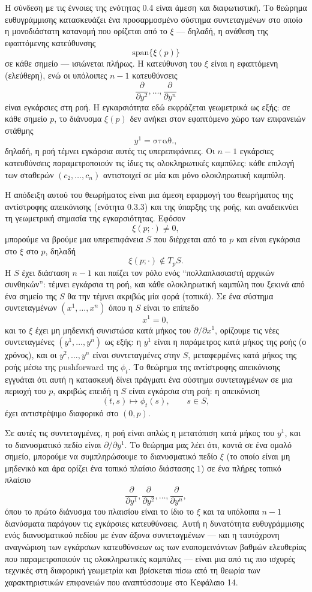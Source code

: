 \documentclass[12pt]{article}
\begin{document}
Η σύνδεση με τις έννοιες της ενότητας 0.4 είναι άμεση και διαφωτιστική. Το θεώρημα ευθυγράμμισης κατασκευάζει ένα προσαρμοσμένο σύστημα συντεταγμένων στο οποίο η μονοδιάστατη κατανομή που ορίζεται από το $\xi$ --- δηλαδή, η ανάθεση της εφαπτόμενης κατεύθυνσης
\[
\text{span}\{\xi(p)\}
\]
σε κάθε σημείο --- ισιώνεται πλήρως. Η κατεύθυνση του $\xi$ είναι η εφαπτόμενη (ελεύθερη), ενώ οι υπόλοιπες $n-1$ κατευθύνσεις
\[
\frac{\partial}{\partial y^2}, \dots, \frac{\partial}{\partial y^n}
\]
είναι εγκάρσιες στη ροή. Η εγκαρσιότητα εδώ εκφράζεται γεωμετρικά ως εξής: σε κάθε σημείο $p$, το διάνυσμα $\xi(p)$ δεν ανήκει στον εφαπτόμενο χώρο των επιφανειών στάθμης
\[
y^1 = \text{σταθ.},
\]
δηλαδή, η ροή τέμνει εγκάρσια αυτές τις υπερεπιφάνειες. Οι $n-1$ εγκάρσιες κατευθύνσεις παραμετροποιούν τις ίδιες τις ολοκληρωτικές καμπύλες: κάθε επιλογή των σταθερών $(c_2, \dots, c_n)$ αντιστοιχεί σε μία και μόνο ολοκληρωτική καμπύλη.

Η απόδειξη αυτού του θεωρήματος είναι μια άμεση εφαρμογή του θεωρήματος της αντίστροφης απεικόνισης (ενότητα 0.3.3) και της ύπαρξης της ροής, και αναδεικνύει τη γεωμετρική σημασία της εγκαρσιότητας. Εφόσον
\[
\xi(p; \cdot) \neq 0,
\]
μπορούμε να βρούμε μια υπερεπιφάνεια $S$ που διέρχεται από το $p$ και είναι εγκάρσια στο $\xi$ στο $p$, δηλαδή
\[
\xi(p; \cdot) \notin T_pS.
\]
Η $S$ έχει διάσταση $n-1$ και παίζει τον ρόλο ενός ``πολλαπλασιαστή αρχικών συνθηκών'': τέμνει εγκάρσια τη ροή, και κάθε ολοκληρωτική καμπύλη που ξεκινά από ένα σημείο της $S$ θα την τέμνει ακριβώς μία φορά (τοπικά). Σε ένα σύστημα συντεταγμένων $(x^1, \dots, x^n)$ όπου η $S$ είναι το επίπεδο
\[
x^1 = 0,
\]
και το $\xi$ έχει μη μηδενική συνιστώσα κατά μήκος του $\partial / \partial x^1$, ορίζουμε τις νέες συντεταγμένες $(y^1, \dots, y^n)$ ως εξής: η $y^1$ είναι η παράμετρος κατά μήκος της ροής (ο χρόνος), και οι $y^2, \dots, y^n$ είναι συντεταγμένες στην $S$, μεταφερμένες κατά μήκος της ροής μέσω της pushforward της $\phi_t$. Το θεώρημα της αντίστροφης απεικόνισης εγγυάται ότι αυτή η κατασκευή δίνει πράγματι ένα σύστημα συντεταγμένων σε μια περιοχή του $p$, ακριβώς επειδή η $S$ είναι εγκάρσια στη ροή: η απεικόνιση
\[
(t, s) \mapsto \phi_t(s), \qquad s \in S,
\]
έχει αντιστρέψιμο διαφορικό στο $(0, p)$.

Σε αυτές τις συντεταγμένες, η ροή είναι απλώς η μετατόπιση κατά μήκος του $y^1$, και το διανυσματικό πεδίο είναι $\partial / \partial y^1$. Το θεώρημα μας λέει ότι, κοντά σε ένα ομαλό σημείο, μπορούμε να συμπληρώσουμε το διανυσματικό πεδίο $\xi$ (το οποίο είναι μη μηδενικό και άρα ορίζει ένα τοπικό πλαίσιο διάστασης $1$) σε ένα πλήρες τοπικό πλαίσιο
\[
\frac{\partial}{\partial y^1}, \frac{\partial}{\partial y^2}, \dots, \frac{\partial}{\partial y^n},
\]
όπου το πρώτο διάνυσμα του πλαισίου είναι το ίδιο το $\xi$ και τα υπόλοιπα $n-1$ διανύσματα παράγουν τις εγκάρσιες κατευθύνσεις. Αυτή η δυνατότητα ευθυγράμμισης ενός διανυσματικού πεδίου με έναν άξονα συντεταγμένων --- και η ταυτόχρονη αναγνώριση των εγκάρσιων κατευθύνσεων ως των εναπομεινάντων βαθμών ελευθερίας που παραμετροποιούν τις ολοκληρωτικές καμπύλες --- είναι μια από τις πιο ισχυρές τεχνικές στη διαφορική γεωμετρία και βρίσκεται πίσω από τη θεωρία των χαρακτηριστικών επιφανειών που αναπτύσσουμε στο Κεφάλαιο 14.
\end{document}
